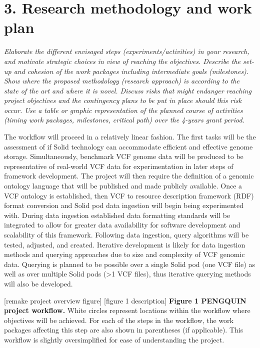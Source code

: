 \documentclass[11pt]{article}
\begin{document}
\section{3. Research methodology and work plan}
\textit{Elaborate the different envisaged steps (experiments/activities) in your research, and motivate strategic choices in view of reaching the objectives. Describe the set-up and cohesion of the work packages including intermediate goals (milestones).
Show where the proposed methodology (research approach) is according to the state of the art and where it is novel. Discuss risks that might endanger reaching project objectives and the contingency plans to be put in place should this risk occur.
Use a table or graphic representation of the planned course of activities (timing work packages, milestones, critical path) over the 4-years grant period.}

The workflow will proceed in a relatively linear fashion. 
The first tasks will be the assessment of if Solid technology can accommodate efficient and effective genome storage. 
Simultaneously, benchmark VCF genome data will be produced to be representative of real-world VCF data for experimentation in later steps of framework development. 
The project will then require the definition of a genomic ontology language that will be published and made publicly available. 
Once a VCF ontology is established, then VCF to resource description framework (RDF) format conversion and Solid pod data ingestion will begin being experimented with. 
During data ingestion established data formatting standards will be integrated to allow for greater data availability for software development and scalability of this framework. 
Following data ingestion, query algorithms will be tested, adjusted, and created. Iterative development is likely for data ingestion methods and querying approaches due to size and complexity of VCF genomic data. 
Querying is planned to be possible over a single Solid pod (one VCF file) as well as over multiple Solid pods (>1 VCF files), thus iterative querying methods will also be developed. 

[remake project overview figure]
[figure 1 description]
\textbf{Figure 1 PENGQUIN project workflow.} 
White circles represent locations within the workflow where objectives will be achieved. 
For each of the steps in the workflow, the work packages affecting this step are also shown in parentheses (if applicable). 
This workflow is slightly oversimplified for ease of understanding the project.
\end{document}
